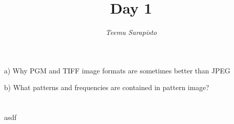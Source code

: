 \documentclass{article}
\begin{document}
\title{Day 1}

\author{\emph{Teemu Sarapisto}}
\maketitle

\newpage

%   
%    

\section{}


a) Why PGM and TIFF image formats are sometimes better than JPEG 

b) What patterns and frequencies are contained in pattern image?

\section{}

asdf

\section{}
\end{document}

